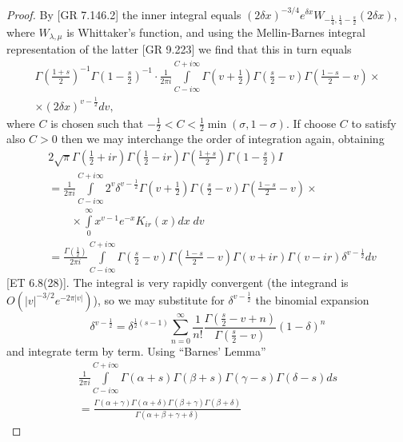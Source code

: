\begin{proof}
By [GR 7.146.2] the inner integral equals $(2 \delta x)^{-3/4} e^{\delta x} W_{-\frac{1}{4}, \frac{1}{4} -\frac{s}{2}} (2 \delta x)$, where $W_{\lambda, \mu}$  is Whittaker's function, and using the Mellin-Barnes integral representation of the latter [GR 9.223] we find that this in turn equals 
\begin{gather*}
\Gamma \left(\frac{1+s}{2} \right)^{-1} \Gamma \left(1-\frac{s}{2} \right)^{-1} \cdot \frac{1}{2 \pi i} \int\limits^{C + i \infty}_{C - i \infty} \Gamma (v+ \frac{1}{2}) \Gamma (\frac{s}{2}-v) \Gamma (\frac{1-s}{2} -v) \times \\
\times (2\delta x)^{v - \frac{1}{2}} d v, 
\end{gather*}
where $C$ is chosen such that $-\frac{1}{2} < C < \frac{1}{2} \min (\sigma, 1 -\sigma)$. If choose $C$ to satisfy also $C>0$ then we may interchange the order of integration again, obtaining
\begin{align*}
& 2 \sqrt{\pi} \Gamma (\frac{1}{2} + ir) \Gamma (\frac{1}{2} -ir) \Gamma \left(\frac{1+s}{2} \right) \Gamma \left(1-\frac{s}{2} \right) I\\
&  =\frac{1}{2 \pi i} \int\limits^{C+ i \infty}_{C -  i \infty} 2^v \delta^{v -\frac{1}{2}} \Gamma (v + \frac{1}{2}) \Gamma \left(\frac{s}{2} -v \right) \Gamma \left(\frac{1-s}{2} - v \right) \times \\
& \qquad \times \int\limits^\infty_{0} x^{v-1} e^{-x} K_{ir} (x) dx \; d v\\
& =\frac{\Gamma (\frac{1}{2})}{2 \pi i} \int\limits^{C + i \infty}_{C - i \infty} \Gamma \left(\frac{s}{2} -v \right) \Gamma \left(\frac{1-s}{2} -v \right) \Gamma (v+ ir) \Gamma (v - ir) \delta^{v -\frac{1}{2}} dv 
\end{align*}
[ET 6.8(28)]. The integral is very rapidly convergent (the integrand is $O(|v|^{-3/2} e^{-2 \pi|v|})$), so we may substitute for $\delta^{v -\frac{1}{2}}$ the binomial expansion
$$
\delta^{v -\frac{1}{2}} =\delta^{\frac{1}{2} (s-1)} \sum\limits^\infty_{n=0} \frac{1}{n!}  \frac{\Gamma \left(\frac{s}{2} - v + n \right)}{\Gamma \left(\frac{s}{2} -v \right)} (1-\delta)^n
$$
and integrate term by term. Using ``Barnes' Lemma''
\begin{gather*}
\frac{1}{2 \pi i} \int\limits^{C + i \infty}_{C - i \infty} \Gamma (\alpha +s) \Gamma (\beta +s) \Gamma (\gamma -s) \Gamma (\delta -s) ds\\
= \frac{\Gamma (\alpha + \gamma) \Gamma (\alpha + \delta) \Gamma (\beta + \gamma) \Gamma (\beta + \delta)}{\Gamma (\alpha + \beta + \gamma + \delta)}
\end{gather*}

\end{proof}
